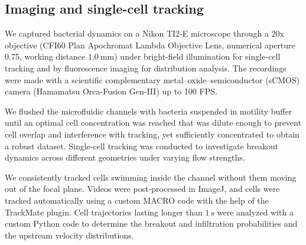 \documentclass[twoside,twocolumn,9pt]{article}
\begin{document}
    \subsection*{Imaging and single-cell tracking}
    
    We captured bacterial dynamics on a Nikon TI2-E microscope through a 20x objective (CFI60 Plan Apochromat Lambda Objective Lens, numerical aperture 0.75, working distance $\SI{1.0}{\milli\meter}$) under bright-field illumination for single-cell tracking and by fluorescence imaging for distribution analysis. The recordings were made with a scientific complementary metal–oxide–semiconductor (sCMOS) camera (Hamamatsu Orca-Fusion Gen-III) up to 100 FPS. 
    
    We flushed the microfluidic channels with bacteria suspended in motility buffer until an optimal cell concentration was reached that was dilute enough to prevent cell overlap and interference with tracking, yet sufficiently concentrated to obtain a robust dataset. Single-cell tracking was conducted to investigate breakout dynamics across different geometries under varying flow strengths.
    
    We consistently tracked cells swimming inside the channel without them moving out of the focal plane. Videos were post-processed in ImageJ, and cells were tracked automatically using a custom MACRO code with the help of the TrackMate plugin. Cell trajectories lasting longer than $\SI{1}{\second}$ were analyzed with a custom Python code to determine the breakout and infiltration probabilities and the upstream velocity distributions.
\end{document}
